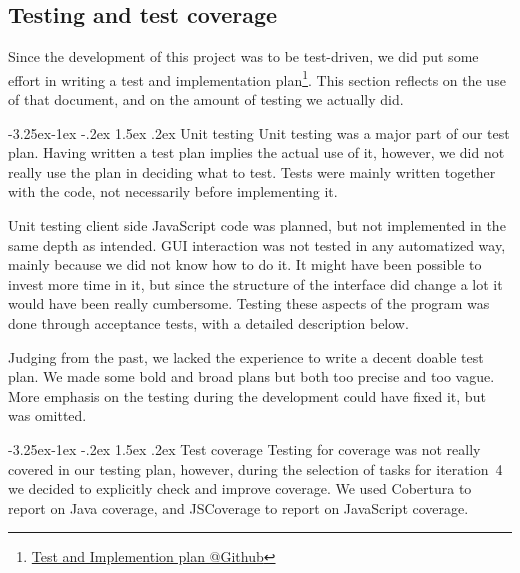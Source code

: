 \documentclass[a4paper]{article}
\makeatletter
\renewcommand\paragraph{\@startsection{paragraph}{4}{\z@}%
  {-3.25ex\@plus -1ex \@minus -.2ex}%
  {1.5ex \@plus .2ex}%
  {\normalfont\normalsize\bfseries}}
\newcommand{\urlTestImplementation}{https://github.com/FelixAkk/synthbio/raw/master/deliverables/test-implementation/test-implementation.pdf}
\newcommand{\hrefTestImplementation}{\href{\urlTestImplementation}{Test and Implemention plan @Github}}
\makeatother
\begin{document}
\pagebreak
\subsection{Testing and test coverage}
\label{process-testing}

Since the development of this project was to be test-driven, we did put some effort in writing a test and implementation plan\footnote{\hrefTestImplementation}. This section reflects on the use of that document, and on the amount of testing we actually did.

\paragraph{Unit testing}
Unit testing was a major part of our test plan. Having written a test plan implies the actual use of it, however, we did not really use the plan in deciding what to test. Tests were mainly written together with the code, not necessarily before implementing it.

Unit testing client side JavaScript code was planned, but not implemented in the same depth as intended. GUI interaction was not tested in any automatized way, mainly because we did not know how to do it. It might have been possible to invest more time in it, but since the structure of the interface did change a lot it would have been really cumbersome. Testing these aspects of the program was done through acceptance tests, with a detailed description below.

Judging from the past, we lacked the experience to write a decent doable test plan. We made some bold and broad plans but both too precise and too vague. More emphasis on the testing during the development could have fixed it, but was omitted.

\paragraph{Test coverage}
Testing for coverage was not really covered in our testing plan, however, during the selection of tasks for iteration~4 we decided to explicitly check and improve coverage. We used Cobertura to report on Java coverage, and JSCoverage to report on JavaScript coverage.
\end{document}
